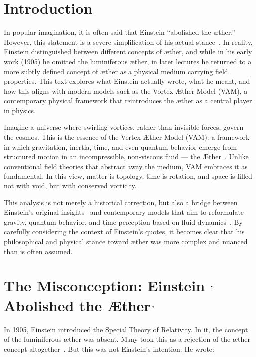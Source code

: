  \section*{Introduction}

    In popular imagination, it is often said that Einstein “abolished the æther.” However, this statement is a severe simplification of his actual stance~\cite{einstein1920aether}. In reality, Einstein distinguished between different concepts of æther, and while in his early work (1905) he omitted the luminiferous æther, in later lectures he returned to a more subtly defined concept of æther as a physical medium carrying field properties. This text explores what Einstein actually wrote, what he meant, and how this aligns with modern models such as the Vortex Æther Model (VAM), a contemporary physical framework that reintroduces the æther as a central player in physics.

    Imagine a universe where swirling vortices, rather than invisible forces, govern the cosmos. This is the essence of the Vortex Æther Model (VAM): a framework in which gravitation, inertia, time, and even quantum behavior emerge from structured motion in an incompressible, non-viscous fluid — the Æther~\cite{iskandarani2024vam1, iskandarani2024vam2}. Unlike conventional field theories that abstract away the medium, VAM embraces it as fundamental. In this view, matter is topology, time is rotation, and space is filled not with void, but with conserved vorticity.

    This analysis is not merely a historical correction, but also a bridge between Einstein's original insights~\cite{einstein1920aether} and contemporary models that aim to reformulate gravity, quantum behavior, and time perception based on fluid dynamics~\cite{iskandarani2014vam}. By carefully considering the context of Einstein's quotes, it becomes clear that his philosophical and physical stance toward æther was more complex and nuanced than is often assumed.


    \section{The Misconception: Einstein \("\)Abolished the Æther\("\)}

    In 1905, Einstein introduced the Special Theory of Relativity. In it, the concept of the luminiferous æther was absent. Many took this as a rejection of the æther concept altogether~\cite{einstein1920aether}. But this was not Einstein's intention. He wrote:


